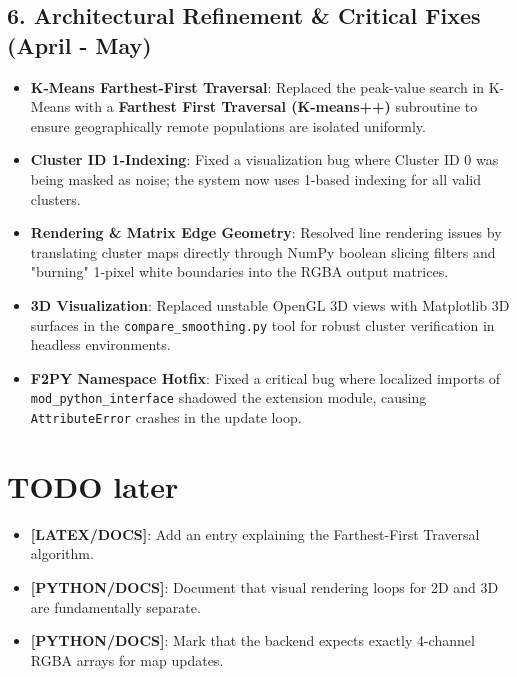 \subsection{6. Architectural Refinement \& Critical Fixes (April - May)}
\begin{itemize}
\item \textbf{K-Means Farthest-First Traversal}: Replaced the peak-value search in K-Means with a \textbf{Farthest First Traversal (K-means++)} subroutine to ensure geographically remote populations are isolated uniformly.
\item \textbf{Cluster ID 1-Indexing}: Fixed a visualization bug where Cluster ID 0 was being masked as noise; the system now uses 1-based indexing for all valid clusters.
\item \textbf{Rendering \& Matrix Edge Geometry}: Resolved line rendering issues by translating cluster maps directly through NumPy boolean slicing filters and "burning" 1-pixel white boundaries into the RGBA output matrices.
\item \textbf{3D Visualization}: Replaced unstable OpenGL 3D views with Matplotlib 3D surfaces in the \texttt{compare\_smoothing.py} tool for robust cluster verification in headless environments.
\item \textbf{F2PY Namespace Hotfix}: Fixed a critical bug where localized imports of \texttt{mod\_python\_interface} shadowed the extension module, causing \texttt{AttributeError} crashes in the update loop.
\end{itemize}

\section{TODO later}
\begin{itemize}
\item \textbf{[LATEX/DOCS]}: Add an entry explaining the Farthest-First Traversal algorithm.
\item \textbf{[PYTHON/DOCS]}: Document that visual rendering loops for 2D and 3D are fundamentally separate.
\item \textbf{[PYTHON/DOCS]}: Mark that the backend expects exactly 4-channel RGBA arrays for map updates.
\end{itemize}

